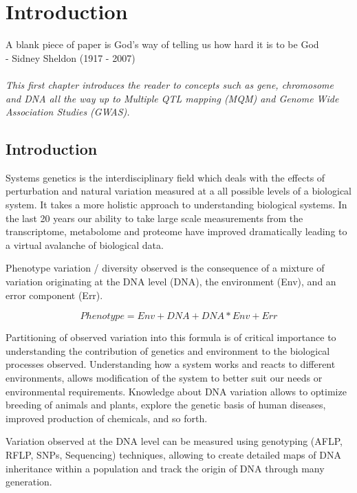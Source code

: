 \chapter{Introduction}
\thispagestyle{empty}
\label{chap:introduction}
A blank piece of paper is God's way of telling us how hard it is to be God\\
- Sidney Sheldon (1917 - 2007)\\\\

\emph{This first chapter introduces the reader to concepts such as gene, chromosome 
and DNA all the way up to Multiple QTL mapping (MQM) and Genome Wide Association Studies 
(GWAS). }

\null
\vfill
\newpage

\section{Introduction}
Systems genetics is the interdisciplinary field which deals with the effects of perturbation 
and natural variation measured at a all possible levels of a biological system. It takes a 
more holistic approach to understanding biological systems. In the last 20 years our ability 
to take large scale measurements from the transcriptome, metabolome and proteome have 
improved dramatically leading to a virtual avalanche of biological data.

Phenotype variation / diversity observed is the consequence of a mixture of variation 
originating at the DNA level (DNA), the environment (Env), and an error component (Err).

$$ Phenotype = Env + DNA + DNA * Env + Err $$

Partitioning of observed variation into this formula is of critical importance 
to understanding the contribution of genetics and environment to the biological 
processes observed. Understanding how a system works and reacts to different 
environments, allows modification of the system to better suit our needs or 
environmental requirements. Knowledge about DNA variation allows to optimize 
breeding of animals and plants, explore the genetic basis of human diseases, 
improved production of chemicals, and so forth.

Variation observed at the DNA level can be measured using genotyping (AFLP, RFLP, 
SNPs, Sequencing) techniques, allowing to create detailed maps of DNA inheritance 
within a population and track the origin of DNA through many generation.

